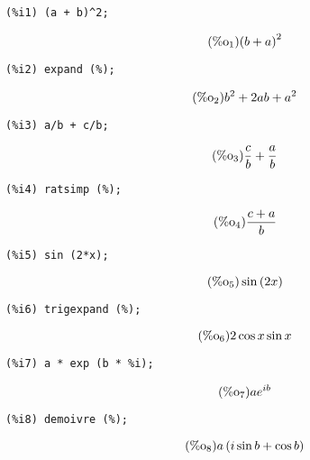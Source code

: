 \documentclass[12pt,leqno]{article}
\begin{document}
\begin{enumerate}
\begin{verbatim}
(%i1) (a + b)^2;
\end{verbatim}
\begin{equation}
\tag{$\mathop{\mathrm{\%o}_{1}}$}{\left(b+a\right)}^{2}
\label{eq:doc-group1-code22-1-1}
\end{equation}
\begin{verbatim}
(%i2) expand (%);
\end{verbatim}
\begin{equation}
\tag{$\mathop{\mathrm{\%o}_{2}}$}{b}^{2}+2 a b+{a}^{2}
\label{eq:doc-group1-code22-2-1}
\end{equation}
\begin{verbatim}
(%i3) a/b + c/b;
\end{verbatim}
\begin{equation}
\tag{$\mathop{\mathrm{\%o}_{3}}$}\frac{c}{b}+\frac{a}{b}
\label{eq:doc-group1-code22-3-1}
\end{equation}
\begin{verbatim}
(%i4) ratsimp (%);
\end{verbatim}
\begin{equation}
\tag{$\mathop{\mathrm{\%o}_{4}}$}\frac{c+a}{b}
\label{eq:doc-group1-code22-4-1}
\end{equation}
\begin{verbatim}
(%i5) sin (2*x);
\end{verbatim}
\begin{equation}
\tag{$\mathop{\mathrm{\%o}_{5}}$}\sin \left(2 x\right)
\label{eq:doc-group1-code22-5-1}
\end{equation}
\begin{verbatim}
(%i6) trigexpand (%);
\end{verbatim}
\begin{equation}
\tag{$\mathop{\mathrm{\%o}_{6}}$}2 \cos x \sin x
\label{eq:doc-group1-code22-6-1}
\end{equation}
\begin{verbatim}
(%i7) a * exp (b * %i);
\end{verbatim}
\begin{equation}
\tag{$\mathop{\mathrm{\%o}_{7}}$}a {e}^{i b}
\label{eq:doc-group1-code22-7-1}
\end{equation}
\begin{verbatim}
(%i8) demoivre (%);
\end{verbatim}
\begin{equation}
\tag{$\mathop{\mathrm{\%o}_{8}}$}a \left(i \sin b+\cos b\right)
\label{eq:doc-group1-code22-8-1}
\end{equation}


\end{enumerate}
\end{document}
